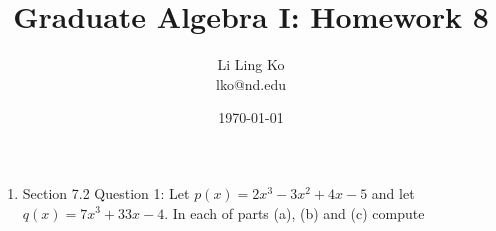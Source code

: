 \documentclass{article}
\begin{document}
\title{Graduate Algebra I: Homework 8}
\author{Li Ling Ko\\ lko@nd.edu}
\date{\today}
\maketitle

\begin{enumerate}[label={\bf Q\arabic*:}]
  \item Section 7.2 Question 1: Let $p(x)=2x^3-3x^2+4x-5$ and let
    $q(x)=7x^3+33x-4$. In each of parts (a), (b) and (c) compute 
\end{enumerate}
\end{document}
